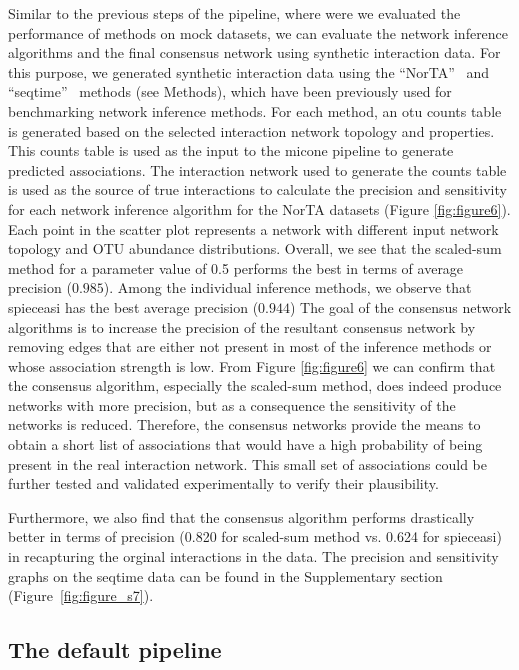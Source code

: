   Similar to the previous steps of the pipeline, where were we evaluated the performance of methods on mock datasets, we can evaluate the network inference algorithms and the final consensus network using synthetic interaction data.
  For this purpose, we generated synthetic interaction data using the ``NorTA''~\cite{Kurtz2015} and ``seqtime''~\cite{faustSignaturesEcologicalProcesses2018} methods (see Methods), which have been previously used for benchmarking network inference methods.
  For each method, an \ac{otu} counts table is generated based on the selected interaction network topology and properties.
  This counts table is used as the input to the \ac{micone} pipeline to generate predicted associations.
  The interaction network used to generate the counts table is used as the source of true interactions to calculate the precision and sensitivity for each network inference algorithm for the NorTA datasets (Figure \ref{fig:figure6}).
  Each point in the scatter plot represents a network with different input network topology and OTU abundance distributions.
  Overall, we see that the scaled-sum method for a parameter value of 0.5 performs the best in terms of average precision ($0.985$).
  Among the individual inference methods, we observe that \ac{spieceasi} has the best average precision ($0.944$)
  The goal of the consensus network algorithms is to increase the precision of the resultant consensus network by removing edges that are either not present in most of the inference methods or whose association strength is low.
  From Figure \ref{fig:figure6} we can confirm that the consensus algorithm, especially the scaled-sum method, does indeed produce networks with more precision, but as a consequence the sensitivity of the networks is reduced.
  Therefore, the consensus networks provide the means to obtain a short list of associations that would have a high probability of being present in the real interaction network.
  This small set of associations could be further tested and validated experimentally to verify their plausibility.

  Furthermore, we also find that the consensus algorithm performs drastically better in terms of precision (0.820 for scaled-sum method vs. 0.624 for \ac{spieceasi}) in recapturing the orginal interactions in the data.
  The precision and sensitivity graphs on the seqtime data can be found in the Supplementary section (Figure~\ref{fig:figure_s7}).

  \FloatBarrier

  \subsection*{The default pipeline}

